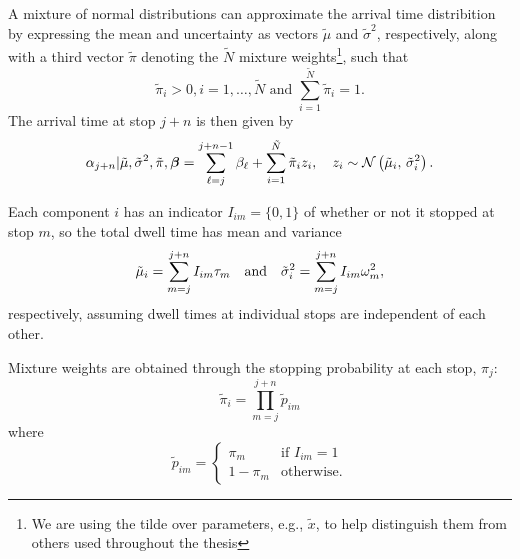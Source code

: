 A mixture of normal distributions can approximate the arrival time distribition \citep{Wang_2012} by expressing the mean and uncertainty as vectors $\tilde\mu$ and $\tilde\sigma^2$, respectively, along with a third vector $\tilde\pi$ denoting the $\tilde N$ mixture weights\footnote{We are using the tilde over parameters, e.g., $\tilde x$, to help distinguish them from others used throughout the thesis}, such that
\begin{equation}
\label{eq:ch5:mixture_weight_spec}
\tilde\pi_i > 0, i = 1, \ldots, \tilde N
\text{ and } \sum_{i=1}^{\tilde N} \tilde\pi_i = 1.
\end{equation}
The arrival time at stop $j + n$ is then given by
\begin{equation}
\label{eq:arrival_time_normal_approx}
\alpha_{j+n} | \tilde\mu, \tilde\sigma^2, \tilde\pi, \boldsymbol\beta =
\sum_{\ell=j}^{j+n-1} \beta_\ell +
\sum_{i=1}^{\tilde N} \tilde\pi_i z_i,\quad
z_i \sim \mathcal{N}\left(\tilde\mu_i,\, \tilde\sigma^2_i\right).
\end{equation}


Each component $i$ has an indicator $I_{im} = \{0,1\}$ of whether or not it stopped at stop $m$, so the total dwell time has mean and variance
\begin{equation}
\label{eq:mixture_dwell_times}
\tilde\mu_i = \sum_{m=j}^{j+n} I_{im} \tau_m\quad\text{and}\quad
\tilde\sigma_i^2 = \sum_{m=j}^{j+n} I_{im} \omega^2_m,
\end{equation}
respectively, assuming dwell times at individual stops are independent of each other.

Mixture weights are obtained through the stopping probability at each stop, $\pi_j$:
\begin{equation}
\label{eq:ch5:mixture_weights}
\tilde\pi_i = \prod_{m=j}^{j+n} \tilde p_{im}
\end{equation}
where
\begin{equation}
\label{eq:ch5:mixture_weights2}
\tilde p_{im} =
\begin{cases}
\pi_m & \text{if } I_{im} = 1 \\
1 - \pi_m & \text{otherwise.}
\end{cases}
\end{equation}


